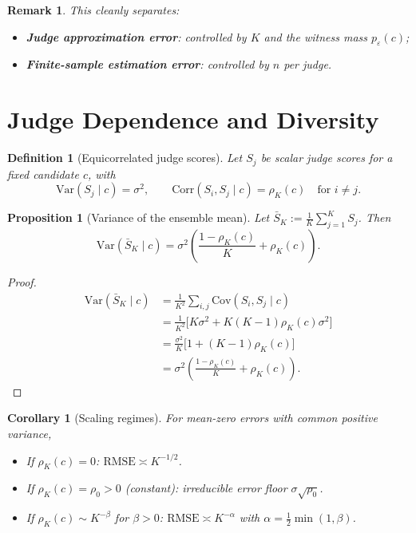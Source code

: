 \documentclass[11pt]{article}
\newtheorem{proposition}[theorem]{Proposition}
\newtheorem{corollary}[theorem]{Corollary}
\newtheorem{definition}[theorem]{Definition}
\newtheorem{remark}[theorem]{Remark}
\begin{document}
\begin{remark}
This cleanly separates:
\begin{itemize}
\item \textbf{Judge approximation error}: controlled by $K$ and the
  witness mass $p_\varepsilon(c)$;
\item \textbf{Finite-sample estimation error}: controlled by $n$ per judge.
\end{itemize}
\end{remark}

\section{Judge Dependence and Diversity}
\label{sec:dependence}

\begin{definition}[Equicorrelated judge scores]
\label{def:equicorrelated}
Let $S_j$ be scalar judge scores for a fixed candidate $c$, with
\begin{equation}
\mathrm{Var}(S_j \mid c) = \sigma^2,
\qquad
\mathrm{Corr}(S_i, S_j \mid c) = \rho_K(c) \quad \text{for } i \neq j.
\end{equation}
\end{definition}

\begin{proposition}[Variance of the ensemble mean]
\label{prop:variance-floor}
Let $\bar S_K := \frac{1}{K} \sum_{j=1}^K S_j$. Then
\begin{equation}
\mathrm{Var}(\bar S_K \mid c)
= \sigma^2 \left(\frac{1 - \rho_K(c)}{K} + \rho_K(c)\right).
\end{equation}
\end{proposition}

\begin{proof}
\begin{align}
\mathrm{Var}(\bar S_K \mid c)
&= \frac{1}{K^2} \sum_{i,j} \mathrm{Cov}(S_i, S_j \mid c) \\
&= \frac{1}{K^2} \Big[K \sigma^2 + K(K-1) \rho_K(c) \sigma^2\Big] \\
&= \frac{\sigma^2}{K} \Big[1 + (K-1)\rho_K(c)\Big] \\
&= \sigma^2 \left(\frac{1 - \rho_K(c)}{K} + \rho_K(c)\right).
\end{align}
\end{proof}

\begin{corollary}[Scaling regimes]
\label{cor:scaling-regimes}
For mean-zero errors with common positive variance,
\begin{itemize}
\item If $\rho_K(c) = 0$: $\mathrm{RMSE} \asymp K^{-1/2}$.
\item If $\rho_K(c) = \rho_0 > 0$ (constant): irreducible error floor
  $\sigma\sqrt{\rho_0}$.
\item If $\rho_K(c) \sim K^{-\beta}$ for $\beta > 0$: $\mathrm{RMSE} \asymp
  K^{-\alpha}$ with $\alpha = \frac{1}{2}\min(1, \beta)$.
\end{itemize}
\end{corollary}
\end{document}
